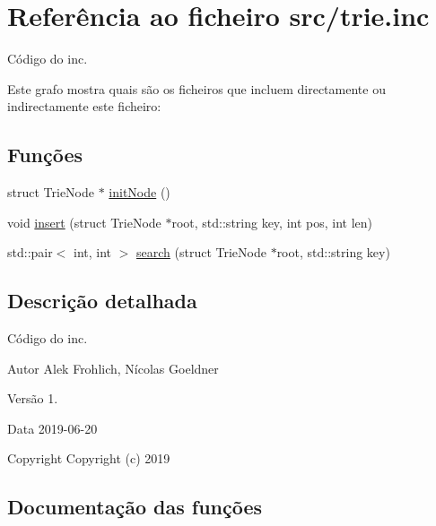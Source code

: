 \hypertarget{trie_8inc}{}\section{Referência ao ficheiro src/trie.inc}
\label{trie_8inc}


Código do inc.  


Este grafo mostra quais são os ficheiros que incluem directamente ou indirectamente este ficheiro\+:
\subsection*{Funções}
\begin{DoxyCompactItemize}
\item 
struct Trie\+Node $\ast$ \hyperlink{trie_8inc_adce0346c8a841ab1d9108bca9209456a}{init\+Node} ()
\item 
void \hyperlink{trie_8inc_a9a7f39351f2c01eda907df97a6d97267}{insert} (struct Trie\+Node $\ast$root, std\+::string key, int pos, int len)
\item 
std\+::pair$<$ int, int $>$ \hyperlink{trie_8inc_a3c9d3332949146639636c0659d6f5c6f}{search} (struct Trie\+Node $\ast$root, std\+::string key)
\end{DoxyCompactItemize}


\subsection{Descrição detalhada}
Código do inc. 

\begin{DoxyAuthor}{Autor}
Alek Frohlich, Nícolas Goeldner 
\end{DoxyAuthor}
\begin{DoxyVersion}{Versão}
1. 
\end{DoxyVersion}
\begin{DoxyDate}{Data}
2019-\/06-\/20
\end{DoxyDate}
\begin{DoxyCopyright}{Copyright}
Copyright (c) 2019 
\end{DoxyCopyright}


\subsection{Documentação das funções}
\mbox{\label{trie_8inc_adce0346c8a841ab1d9108bca9209456a}} 
